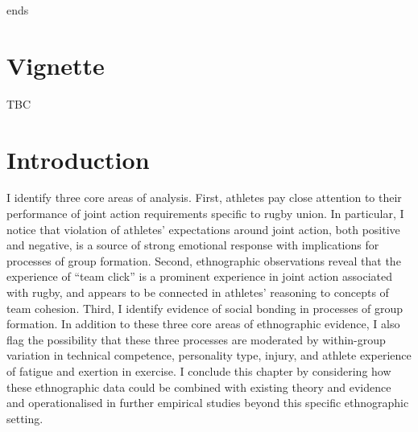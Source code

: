                                       \begin{CJK}{UTF8}{gbsn}
                                        ends


\section{Vignette}

TBC

\section{Introduction}



 I identify three core areas of analysis.  First, athletes pay close attention to their performance of joint action requirements specific to rugby union.  In particular, I notice that violation of athletes' expectations around joint action, both positive and negative, is a source of strong emotional response with implications for processes of group formation.  Second, ethnographic observations reveal that the experience of ``team click'' is a prominent experience in joint action associated with rugby, and appears to be connected in athletes' reasoning to concepts of team cohesion.  Third, I identify evidence of social bonding in processes of group formation.  In addition to these three core areas of ethnographic evidence, I also flag the possibility that these three processes are moderated by within-group variation in technical competence, personality type, injury, and athlete experience of fatigue and exertion in exercise.  I conclude this chapter by considering how these ethnographic data could be combined with existing theory and evidence and operationalised in further empirical studies beyond this specific ethnographic setting.


\end{CJK}
